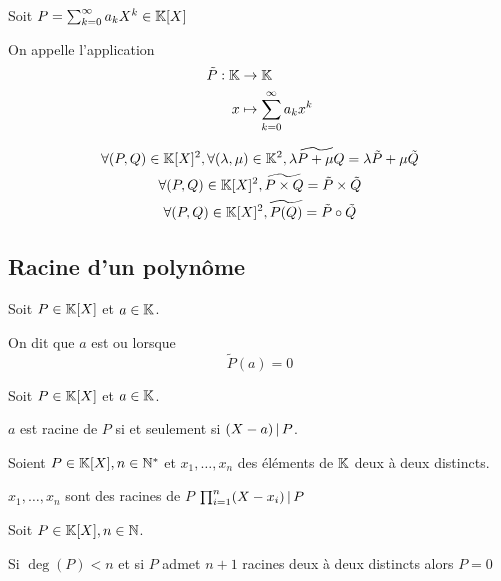 \begin{dfn}
  Soit $P = \sum^\infty_{k = 0} a_k X^k \in \mathbb{K}[X]$

  On appelle  l'application
  \begin{align*}
    \tilde{P} : \mathbb{K} &\to \mathbb{K} \\
      x &\mapsto \sum^\infty_{k = 0} a_k x^k
  \end{align*}
\end{dfn}

\begin{prp}
  \begin{gather*}
    \forall (P, Q) \in \mathbb{K}[X]^2, \forall (\lambda, \mu) \in \mathbb{K}^2,
      \widetilde{\lambda P + \mu Q} = \lambda \tilde{P} + \mu \tilde{Q} \\
    \forall (P, Q) \in \mathbb{K}[X]^2, \widetilde{P \times Q} = \tilde{P} \times \tilde{Q} \\
    \forall (P, Q) \in \mathbb{K}[X]^2, \widetilde{P(Q)} = \tilde{P} \circ \tilde{Q}
  \end{gather*}
\end{prp}

\subsection{Racine d'un polynôme}

\begin{dfn}
  Soit $P \in \mathbb{K}[X]$ et $a \in \mathbb{K}$.

  On dit que $a$ est  ou
   lorsque
  \[
    \tilde{P}(a) = 0
  \]
\end{dfn}

\begin{prp}
  Soit $P \in \mathbb{K}[X]$ et $a \in \mathbb{K}$.

  $a$ est racine de $P$ si et seulement si $(X - a) \operatorname{|} P$.
\end{prp}

\begin{cor}
  Soient $P \in \mathbb{K}[X], n \in \mathbb{N}^*$ et $x_1, \ldots, x_n$ des éléments
  de $\mathbb{K}$ deux à deux distincts.

  $x_1, \ldots, x_n$ sont des racines de $P$ \ssi $\prod^n_{i = 1} (X - x_i) \operatorname{|} P$
\end{cor}

\begin{cor}
  Soit $P \in \mathbb{K}[X], n \in \mathbb{N}$.

  Si $\deg(P) < n$ et si $P$ admet $n + 1$ racines deux à deux
  distincts alors $P = 0$
\end{cor}

